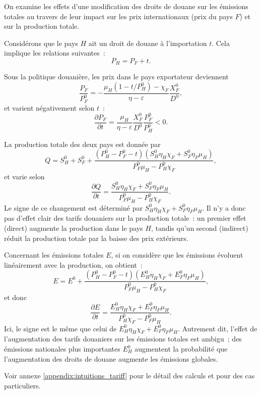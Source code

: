 On examine les effets d'une modification des droits de douane sur les émissions totales au travers de leur impact sur les prix internationaux (prix du pays $F$) et sur la production totale.

Considérons que le pays $H$ ait un droit de douane à l'importation $t$. Cela implique les relations suivantes~:
\begin{equation}
    P_H = P_F + t.
\end{equation}

Sous la politique douanière, les prix dans le pays exportateur deviennent
\begin{equation}
    \frac{P_F}{P_F^0} = -\frac{\mu_H (1 - t/P_H^0) - \chi_F}{\eta - \varepsilon}\frac{X_F^0}{D^0},
\end{equation}
et varient négativement selon $t$~:
\begin{equation}
    \frac{\partial P_F}{\partial t} = \frac{\mu_H}{\eta - \varepsilon} \frac{X_F^0}{D^0} \frac{P_F^0}{P_H^0} < 0.
\end{equation}

La production totale des deux pays est donnée par
\begin{equation}
    Q = S_H^0 + S_F^0 + \frac{(P_H^0 - P_F^0 - t)(S_H^0 \eta_H \chi_F + S_F^0 \eta_F \mu_H)}{P_F^0 \mu_H - P_H^0 \chi_F},
\end{equation}
et varie selon
\begin{equation}
    \frac{\partial Q}{\partial t} = \frac{S_H^0 \eta_H \chi_F + S_F^0 \eta_F \mu_H}{P_F^0 \mu_H - P_H^0 \chi_F}.
\end{equation}
Le signe de ce changement est déterminé par $S_H^0 \eta_H \chi_F + S_F^0 \eta_F \mu_H$. Il n'y a donc pas d'effet clair des tarifs douaniers sur la production totale~: un premier effet (direct) augmente la production dans le pays $H$, tandis qu'un second (indirect) réduit la production totale par la baisse des prix extérieurs.

Concernant les émissions totales $E$, si on considère que les émissions évoluent linéairement avec la production, on obtient~:
\begin{equation}
    E = E^0 + \frac{(P_H^0 - P_F^0 - t)(E_H^0 \eta_H \chi_F + E_F^0 \eta_F \mu_H)}{P_F^0 \mu_H - P_H^0 \chi_F},
\end{equation}
et donc
\begin{equation}\label{eq:eq_intuition_delta_em}
    \frac{\partial E}{\partial t} = \frac{E_H^0 \eta_H \chi_F + E_F^0 \eta_F \mu_H}{P_H^0 \chi_F - P_F^0 \mu_H}.
\end{equation}
Ici, le signe est le même que celui de $E_H^0 \eta_H \chi_F + E_F^0 \eta_F \mu_H$. Autrement dit, l'effet de l'augmentation des tarifs douaniers sur les émissions totales est ambigu~; des émissions nationales plus importantes $E_H^0$ augmentent la probabilité que l'augmentation des droits de douane augmente les émissions globales.

Voir annexe \ref{appendix:intuitions_tariff} pour le détail des calculs et pour des cas particuliers.
